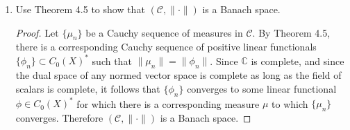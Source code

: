\documentclass[11pt,oneside,english]{amsart}
\theoremstyle{definition}
\newcommand{\MC}[1]{\mathcal{#1}}
\newcommand{\MB}[1]{\mathbb{#1}}
\begin{document}
\begin{enumerate}
\begin{enumerate}
\item Use Theorem 4.5 to show that $(\MC{C},\|\cdot\|)$ is a Banach space.

\begin{proof}
Let $\{\mu_n\}$ be a Cauchy sequence of measures in $\MC{C}$. By Theorem 4.5, there is a corresponding Cauchy sequence of positive linear functionals $\{\phi_n\}\subset C_0(X)^*$ such that $\|\mu_n\|=\|\phi_n\|$. Since $\MB{C}$ is complete, and since the dual space of any normed vector space is complete as long as the field of scalars is complete, it follows that $\{\phi_n\}$ converges to some linear functional $\phi\in C_0(X)^*$ for which there is a corresponding measure $\mu$ to which $\{\mu_n\}$ converges. Therefore $(\MC{C},\|\cdot\|)$ is a Banach space.
\end{proof}

\end{enumerate}


\end{enumerate}
\end{document}
